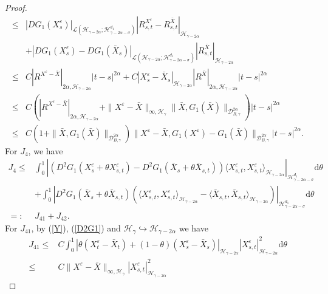 \documentclass[10pt,a4paper]{amsart}
\begin{document}
\begin{proof}
\begin{align}
		\leq & |DG_1(X_s^\varepsilon)|_{\mathcal L(\mathcal H_{\gamma-2\alpha}; \mathcal H_{\gamma-2\alpha-\sigma}^{d_1 })} |R_{s,t}^{X^\varepsilon}-R_{s,t}^{\bar{X}}|_{\mathcal H_{\gamma-2\alpha}}  \nonumber\\
		&+|DG_1(X_s^\varepsilon)-DG_1(\bar{X}_s)|_{\mathcal L (\mathcal H_{\gamma-2\alpha}; \mathcal H_{\gamma-2\alpha-\sigma}^{d_1 })} |R_{s,t}^{\bar{X}}|_{\mathcal H_{\gamma-2\alpha}} \nonumber\\
		\leq & C |R^{X^\varepsilon-\bar{X}}|_{2\alpha, \mathcal H_{\gamma-2\alpha}} |t-s|^{2\alpha} +C |X_s^\varepsilon-\bar{X}_s|_{\mathcal H_{\gamma-2\alpha}} |R^{\bar{X}} |_{2\alpha, \mathcal H_{\gamma-2\alpha}} |t-s|^{2\alpha} \nonumber\\
		\leq & C \left(|R^{X^\varepsilon-\bar{X}}|_{2\alpha, \mathcal H_{\gamma-2\alpha}}+\|X^\varepsilon-\bar{X}\|_{\infty, \mathcal H_\gamma} \|\bar{X}, G_1(\bar{X})\|_{\mathcal{D}_{ B,\gamma}^{2\alpha}}  \right) |t-s|^{2\alpha}  \nonumber\\
		\leq & C \left( 1+\|\bar{X}, G_1(\bar{X})\|_{\mathcal{D}_{ B,\gamma}^{2\alpha}} \right) \|X^\varepsilon-\bar{X},G_1(X^\varepsilon)-G_1(\bar{X})\|_{\mathcal{D}_{ B,\gamma}^{2\alpha}} |t-s|^{2\alpha}.
	\end{align}
	For $J_4$, we have
	\begin{align*}
		J_4 \leq & \int_0^1 |(D^2 G_1(X_s^\varepsilon+\theta X_{s,t}^\varepsilon)-D^2 G_1(\bar{X}_s+\theta \bar{X}_{s,t}))  \langle X_{s,t}^\varepsilon, X_{s,t}^\varepsilon \rangle_{\mathcal H_{\gamma-2\alpha} }   |_{\mathcal H_{\gamma-2\alpha-\sigma}^{d_1 }} \mathrm{d} \theta \nonumber\\
		&+\int_0^1 |D^2 G_1(\bar{X}_s+\theta \bar{X}_{s,t}) ( \langle X_{s,t}^\varepsilon, X_{s,t}^\varepsilon \rangle_{\mathcal H_{\gamma-2\alpha} }-\langle \bar{X}_{s,t}, \bar{X}_{s,t} \rangle_{\mathcal H_{\gamma-2\alpha} } ) |_{\mathcal H_{\gamma-2\alpha-\sigma}^{d_1 }} \mathrm{d} \theta \nonumber\\
		=:& J_{41}+J_{42}.
	\end{align*}
	For $J_{41}$, by (\ref{Y}), (\ref{D2G1}) and $\mathcal H_\gamma \hookrightarrow \mathcal H_{\gamma-2\alpha}$ we have
	\begin{align}\label{J41}
		J_{41} 	\leq & C  \int_0^1 |\theta (X_t^\varepsilon-\bar{X}_t)+(1-\theta) (X_s^\varepsilon-\bar{X}_s)|_{\mathcal H_{\gamma-2\alpha}} |X_{s,t}^\varepsilon|_{\mathcal H_{\gamma-2\alpha}}^2 \mathrm{d} \theta \nonumber\\
		\leq  & C \|X^\varepsilon-\bar{X}\|_{\infty, \mathcal H_\gamma} |X_{s,t}^\varepsilon|_{\mathcal H_{\gamma-2\alpha}}^2

\end{align}
\end{proof}
\end{document}
